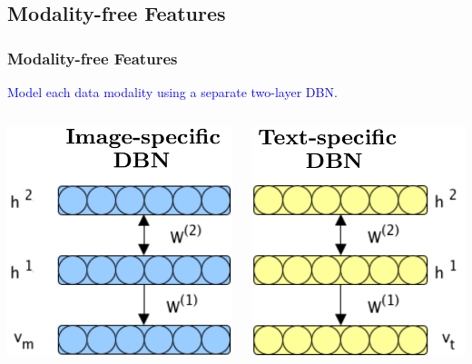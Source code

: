 \documentclass{beamer}
\begin{document}
\begin{CJK*}{UTF8}{gbsn}
\subsection{Modality-free Features}
\begin{frame}[allowframebreaks]\frametitle{Modality-free Features}
\textcolor{blue}{Model each data modality using a separate two-layer DBN}.\\
\begin{columns}
\begin{column}{0.5\textwidth}
\centering
\includegraphics[scale=0.25]{images/imageDBN}
\end{column}
\begin{column}{0.5\textwidth}
\centering
\includegraphics[scale=0.25]{images/textDBN}
\end{column}
\end{columns}


\end{frame}
\end{CJK*}
\end{document}

